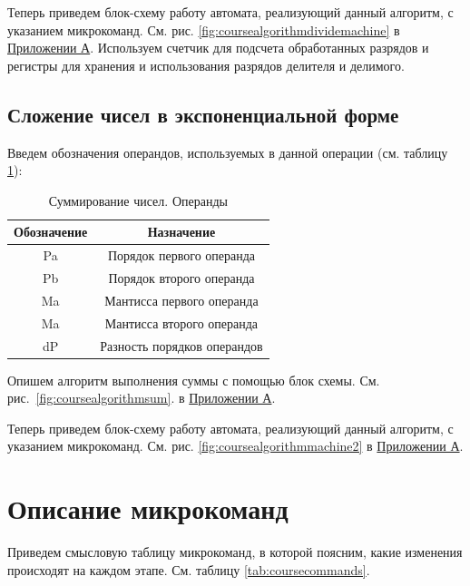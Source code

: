\documentclass[a4paper,14pt]{extarticle}
\begin{document}
Теперь приведем блок-схему работу автомата, реализующий данный алгоритм, с указанием микрокоманд. См. рис. \ref{fig:coursealgorithmdividemachine} в \hyperref[tam]{Приложении А}. Используем счетчик для подсчета обработанных разрядов и регистры для хранения и использования разрядов делителя и делимого.
\fi

\subsection{Сложение чисел в экспоненциальной форме}
Введем обозначения операндов, используемых в данной операции (см. таблицу \ref{tab:varssum}):
\begin{table}[h!]
	\small
	\centering
	\begin{tabular}{|c|c|}
		\hline
		\multicolumn{1}{|c|}{\textbf{Обозначение}} & \multicolumn{1}{c|}{\textbf{Назначение}} \\ \hline
		Pa & Порядок первого операнда \\ \hline
		Pb & Порядок второго операнда \\ \hline
		Ma & Мантисса первого операнда \\ \hline
		Ma & Мантисса второго операнда \\ \hline
		dP & Разность порядков операндов \\ \hline
	\end{tabular}
	\caption{Суммирование чисел. Операнды}
	\label{tab:varssum}
	
\end{table} 

Опишем алгоритм выполнения суммы  с помощью блок схемы. См. рис.~\ref{fig:coursealgorithmsum}. в \hyperref[tam]{Приложении А}.

Теперь приведем блок-схему работу автомата, реализующий данный алгоритм, с указанием микрокоманд. См. рис. \ref{fig:coursealgorithmmachine2} в \hyperref[tam]{Приложении А}.
\fi

\section{Описание микрокоманд}

Приведем смысловую таблицу микрокоманд, в которой поясним, какие изменения происходят на каждом этапе. См. таблицу \ref{tab:coursecommands}.
\end{document}
